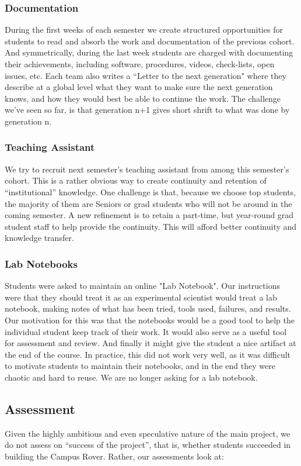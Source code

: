 \subsubsection{Documentation} During the first weeks of each semester we create structured opportunities for students to read and absorb the work and documentation of the previous cohort. And symmetrically, during the last week students are charged with documenting their achievements, including software, procedures, videos, check-lists, open issues, etc. Each team also writes a ``Letter to the next generation" where they describe at a global level what they want to make sure the next generation knows, and how they would best be able to continue the work. The challenge we've seen so far, is that generation n+1 gives short shrift to what was done by generation n.

\subsubsection{Teaching Assistant}We try to recruit next semester's teaching assistant from among this semester's cohort. This is a rather obvious way to create continuity and retention of ``institutional'' knowledge. One challenge is that, because we choose top students, the majority of them are Seniors or grad students who will not be around in the coming semester. A new refinement is to retain a part-time, but year-round grad student staff to help provide the continuity. This will afford better continuity and knowledge transfer.
\subsubsection{Lab Notebooks}Students were asked to maintain an online "Lab Notebook". Our instructions were that they should treat it as an experimental scientist would treat a lab notebook, making notes of what has been tried, tools used, failures, and results. Our motivation for this was that the notebooks would be a good tool to help the individual student keep track of their work. It would also serve as a useful tool for assessment and review. And finally it might give the student a nice artifact at the end of the course. In practice, this did not work very well, as it was difficult to motivate students to maintain their notebooks, and in the end they were chaotic and hard to reuse. We are no longer asking for a lab notebook.

\subsection{Assessment} Given the highly ambitious and even speculative nature of the main project, we do not assess on ``success of the project'', that is, whether students succeeded in building the Campus Rover. Rather, our assessments look at:

